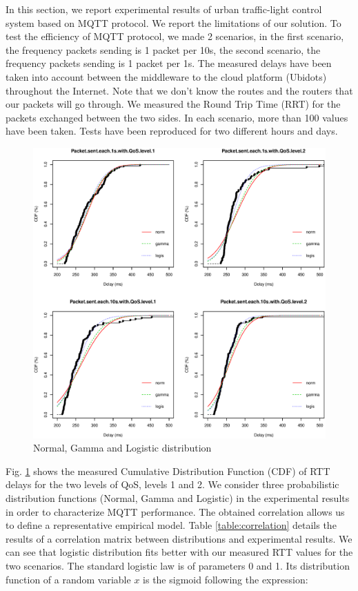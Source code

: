 \documentclass[conference]{../../setup/IEEEtran}
\begin{document}
In this section, we report experimental results of urban traffic-light control system based on MQTT protocol. We report the limitations of our solution. To test the efficiency of MQTT protocol, we made 2 scenarios, in the first scenario, the frequency  packets sending  is 1 packet per 10s, the second scenario, the frequency  packets sending  is 1 packet per 1s. The measured delays have been taken into account between the middleware to the cloud platform (Ubidots) throughout the Internet. Note that we don't know the routes and the routers that our packets will go through. We measured the Round Trip Time (RRT) for the packets exchanged between the two sides. In each scenario, more than 100 values have been taken. Tests have been reproduced for two different hours and days.


\begin{figure}[!htb]
\centering
\includegraphics[width=\columnwidth]{res/distributions_v3.eps}
\caption{Normal, Gamma and Logistic distribution}
\label{fig:cdf_distribution.pdf}
\end{figure}

Fig. \ref{fig:cdf_distribution.pdf} shows the measured Cumulative Distribution Function (CDF) of RTT delays for the two levels of QoS, levels 1 and 2. We consider three probabilistic distribution functions (Normal, Gamma and Logistic) in the experimental results in order to characterize MQTT performance. The obtained correlation allows us to define a representative empirical model. Table \ref{table:correlation} details the results of a correlation matrix between distributions and experimental results. We can see that logistic distribution \cite{STEPHENS1979} fits better with our measured RTT values for the two scenarios. The standard logistic law is of parameters 0 and 1. Its distribution function of a random variable $x$ is the sigmoid following the expression:
\end{document}
